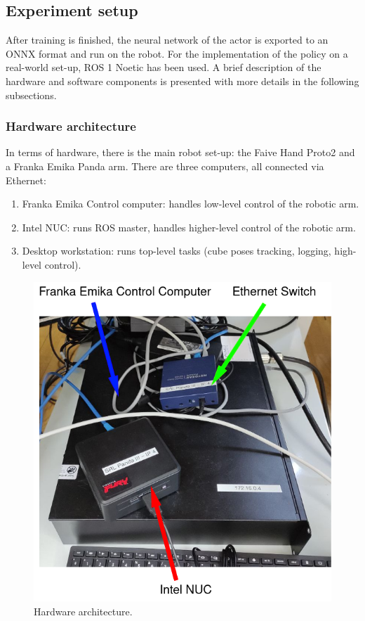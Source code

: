 \documentclass[a4paper]{article}
\begin{document}
\newpage

\subsection{Experiment setup}
After training is finished, the neural network of the actor is exported to an ONNX format and run on the robot. For the implementation of the policy on a real-world set-up, ROS 1 Noetic has been used. A brief description of the hardware and software components is presented with more details in the following subsections.

\subsubsection{Hardware architecture}
In terms of hardware, there is the main robot set-up: the Faive Hand Proto2 and a Franka Emika Panda arm. There are three computers, all connected via Ethernet:

\begin{enumerate}
    \item Franka Emika Control computer: handles low-level control of the robotic arm.
    \item Intel NUC: runs ROS master, handles higher-level control of the robotic arm.
    \item Desktop workstation: runs top-level tasks (cube poses tracking, logging, high-level control).
\end{enumerate}

\begin{figure}[!hb]
    \centering
    \includegraphics[scale=0.8]{images/hardware_steup.png}
    \caption{Hardware architecture.}
\end{figure}
\end{document}

